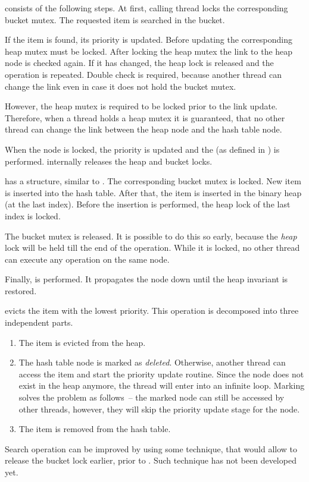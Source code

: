 \begin{block-description}
\item[\findop] consists of the following steps. At first, calling thread locks the corresponding bucket mutex. The requested item is searched in the bucket.

If the item is found, its priority is updated.
Before updating the corresponding heap mutex must be locked.
After locking the heap mutex the link to the heap node is checked again. If it has changed, the heap lock is released and the operation is repeated. Double check is required, because another thread can change the link even in case it does not hold the bucket mutex.

However, the heap mutex is required to be locked prior to the link update. Therefore, when a thread holds a heap mutex it is guaranteed, that no other thread can change the link between the heap node and the hash table node.

When the node is locked, the priority is updated and the  (as defined in \cite{champ}) is performed.  internally releases the heap and bucket locks.

\item[\insertop] has a structure, similar to \findop.
The corresponding bucket mutex is locked.
New item is inserted into the hash table. After that, the item is inserted in the binary heap (at the last index). Before the insertion is performed, the heap lock of the last index is locked.

The bucket mutex is released. It is possible to do this so early, because the \emph{heap} lock will be held till the end of the operation. While it is locked, no other thread can execute any operation on the same node.

Finally, \cite{champ} is performed. It propagates the node down until the heap invariant is restored.

 evicts the item with the lowest priority. This operation is decomposed into three independent parts.

\begin{enumerate}
\item The item is evicted from the heap.
\item The hash table node is marked as \emph{deleted}. Otherwise, another thread can access the item and start the priority update routine. Since the node does not exist in the heap anymore, the thread will enter into an infinite loop. Marking solves the problem as follows~-- the marked node can still be accessed by other threads, however, they will skip the priority update stage for the node.
\item The item is removed from the hash table.
\end{enumerate}

\end{block-description}
Search operation can be improved by using some technique, that would allow to release the bucket lock earlier, prior to . Such technique has not been developed yet.

